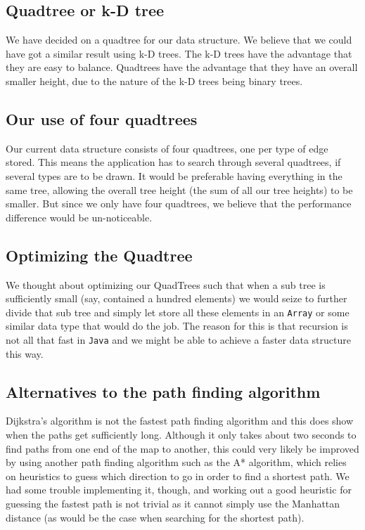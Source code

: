\documentclass[a4paper,11pt]{article}
\begin{document}
\subsection{Quadtree or k-D tree}
We have decided on a quadtree for our data structure. We believe that we could have got a similar result using k-D trees. The k-D trees have the advantage that they are easy to balance. Quadtrees have the advantage that they have an overall smaller height, due to the nature of the k-D trees being binary trees.

\subsection{Our use of four quadtrees}
Our current data structure consists of four quadtrees, one per type of edge stored. This means the application has to search through several quadtrees, if several types are to be drawn. It would be preferable having everything in the same tree, allowing the overall tree height (the sum of all our tree heights) to be smaller. But since we only have four quadtrees, we believe that the performance difference would be un-noticeable.

\subsection{Optimizing the Quadtree}
We thought about optimizing our QuadTrees such that when a sub tree is sufficiently small (say, contained a hundred elements) we would seize to further divide that sub tree and simply let store all these elements in an \texttt{Array} or some similar data type that would do the job. The reason for this is that recursion is not all that fast in \texttt{Java} and we might be able to achieve a faster data structure this way.

\subsection{Alternatives to the path finding algorithm}
Dijkstra's algorithm is not the fastest path finding algorithm and this does show when the paths get sufficiently long. Although it only takes about two seconds to find paths from one end of the map to another, this could very likely be improved by using another path finding algorithm such as the A* algorithm, which relies on heuristics to guess which direction to go in order to find a shortest path. We had some trouble implementing it, though, and working out a good heuristic for guessing the fastest path is not trivial as it cannot simply use the Manhattan distance (as would be the case when searching for the shortest path).
\end{document}
